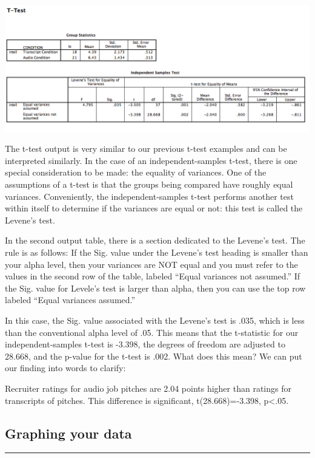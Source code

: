 \documentclass[
]{book}
\begin{document}
\includegraphics{img/7.4.17.png}

The t-test output is very similar to our previous t-test examples and can be interpreted similarly. In the case of an independent-samples t-test, there is one special consideration to be made: the equality of variances. One of the assumptions of a t-test is that the groups being compared have roughly equal variances. Conveniently, the independent-samples t-test performs another test within itself to determine if the variances are equal or not: this test is called the Levene's test.

In the second output table, there is a section dedicated to the Levene's test. The rule is as follows: If the Sig. value under the Levene's test heading is smaller than your alpha level, then your variances are NOT equal and you must refer to the values in the second row of the table, labeled ``Equal variances not assumed.'' If the Sig. value for Levele's test is larger than alpha, then you can use the top row labeled ``Equal variances assumed.''

In this case, the Sig. value associated with the Levene's test is .035, which is less than the conventional alpha level of .05. This means that the t-statistic for our independent-samples t-test is -3.398, the degrees of freedom are adjusted to 28.668, and the p-value for the t-test is .002. What does this mean? We can put our finding into words to clarify:

Recruiter ratings for audio job pitches are 2.04 points higher than ratings for transcripts of pitches. This difference is significant, t(28.668)=-3.398, p\textless.05.

\hypertarget{graphing-your-data}{%
\subsection{Graphing your data}\label{graphing-your-data}}

\begin{center}\rule{0.5\linewidth}{0.5pt}\end{center}
\end{document}
